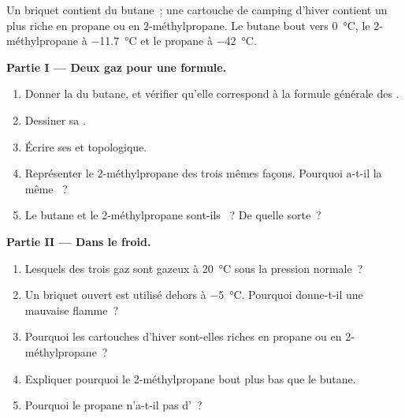 \begin{problem}
\label{pb:g11:organic-skeletons:1}
Un briquet contient du butane~; une cartouche de camping d'hiver contient
un  plus riche en propane ou en 2-méthylpropane. Le butane bout
vers \qty{0}{\celsius}, le 2-méthylpropane à \qty{-11.7}{\celsius} et le
propane à \qty{-42}{\celsius}.

\medskip
\noindent\textbf{Partie I --- Deux gaz pour une formule.}
\begin{enumerate}
  \item Donner la  du butane, et vérifier qu'elle correspond
        à la formule générale des .
  \item Dessiner sa .
  \item Écrire ses  et topologique.
  \item Représenter le 2-méthylpropane des trois mêmes façons. Pourquoi
        a-t-il la même ~?
  \item Le butane et le 2-méthylpropane sont-ils ~? De quelle
        sorte~?
\end{enumerate}

\medskip
\noindent\textbf{Partie II --- Dans le froid.}
\begin{enumerate}[resume]
  \item Lesquels des trois gaz sont gazeux à \qty{20}{\celsius} sous la
        pression normale~?
  \item Un briquet ouvert est utilisé dehors à \qty{-5}{\celsius}.
        Pourquoi donne-t-il une mauvaise flamme~?
  \item Pourquoi les cartouches d'hiver sont-elles riches en propane ou
        en 2-méthylpropane~?
  \item Expliquer pourquoi le 2-méthylpropane bout plus bas que le
        butane.
  \item Pourquoi le propane n'a-t-il pas d'~?
\end{enumerate}


\end{problem}
